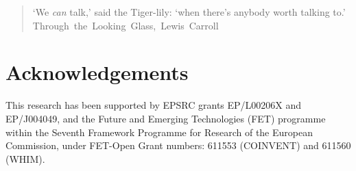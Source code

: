 \documentclass[letterpaper]{article}
\newcommand*{\sourceatright}[1]{\unskip\hspace{1em plus 1fill}%
\nolinebreak[3]\hspace*{\fill}\mbox{#1}}%
\begin{document}
\begin{quote}
{\small `We \emph{can} talk,' said the Tiger-lily: `when there's anybody worth talking to.'\\
\sourceatright{Through the Looking Glass, Lewis Carroll}}
\end{quote}









 




\section*{Acknowledgements} \label{sec:acknowledgements}
This research has been supported by EPSRC grants EP/L00206X and
EP/J004049, and the Future and Emerging Technologies (FET) programme
within the Seventh Framework Programme for Research of the European
Commission, under FET-Open Grant numbers: 611553 (COINVENT) and 611560
(WHIM).

\printbibliography
\end{document}
